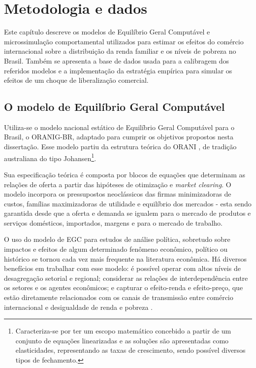 

\chapter{Metodologia e dados} \label{cha:metodologia}

Este capítulo descreve os modelos de Equilíbrio Geral Computável e microssimulação comportamental utilizados para estimar os efeitos do comércio internacional sobre a distribuição da renda familiar e os níveis de pobreza no Brasil. Também se apresenta a base de dados usada para a calibragem dos referidos modelos e a implementação da estratégia empírica para simular os efeitos de um choque de liberalização comercial.


\section{O modelo de Equilíbrio Geral Computável} \label{sec:egc}

Utiliza-se o modelo nacional estático de Equilíbrio Geral Computável para o Brasil, o ORANIG-BR, adaptado para cumprir os objetivos propostos nesta dissertação. Esse modelo partiu da estrutura teórica do ORANI \cite{dixit80}, de tradição australiana do tipo Johansen\footnote{Caracteriza-se por ter um escopo matemático concebido a partir de um conjunto de equações linearizadas e as soluções são apresentadas como elasticidades, representando as taxas de crescimento, sendo possível diversos tipos de fechamento.}.

Sua especificação teórica é composta por blocos de equações que determinam as relações de oferta a partir das hipóteses de otimização e \textit{market clearing}. O modelo incorpora os pressupostos neoclássicos das firmas minimizadoras de custos, famílias maximizadoras de utilidade e equilíbrio dos mercados - esta sendo garantida desde que a oferta e demanda se igualem para o mercado de produtos e serviços domésticos, importados, margens e para o mercado de trabalho.

O uso do modelo de EGC para estudos de análise política, sobretudo sobre impactos e efeitos de algum determinado fenômeno econômico, político ou histórico se tornou cada vez mais frequente na literatura econômica. Há diversos benefícios em trabalhar com esse modelo: é possível operar com altos níveis de desagregação setorial e regional; considerar as relações de interdependência entre os setores e os agentes econômicos; e capturar o efeito-renda e efeito-preço, que estão diretamente relacionados com os canais de transmissão entre comércio internacional e desigualdade de renda e pobreza \cite{anderson20}.

